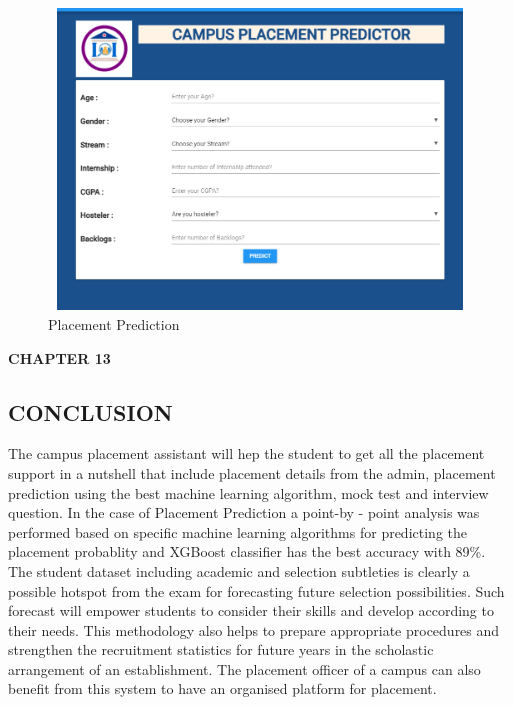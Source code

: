 \documentclass[12pt]{article}
\begin{document}
\begin{figure}[H]
\begin{center}
 \includegraphics[width=16cm, height=8cm]{Screenshot6}
\caption{Placement Prediction}
\end{center}
\end{figure}

\newpage


\begin{flushleft}\textbf{CHAPTER 13} \end{flushleft}
\begin{flushleft}\section{CONCLUSION} \end{flushleft}
The campus placement assistant will hep the student to get all the placement support in a nutshell that include placement details from the admin, placement prediction using the best machine learning algorithm, mock test and interview question. In the case of Placement Prediction a point-by - point analysis was performed based on specific 
machine learning algorithms for predicting the placement probablity and XGBoost classifier has the best accuracy with 89\%. The student dataset including academic and selection subtleties is clearly a 
possible hotspot from the exam for forecasting future selection 
possibilities. Such forecast will empower students to consider 
their skills and develop according to their needs. This 
methodology also helps to prepare appropriate procedures and 
strengthen the recruitment statistics for future years in the 
scholastic arrangement of an establishment. The placement officer of a campus can also benefit from this system to have an organised platform for placement.
\end{document}
